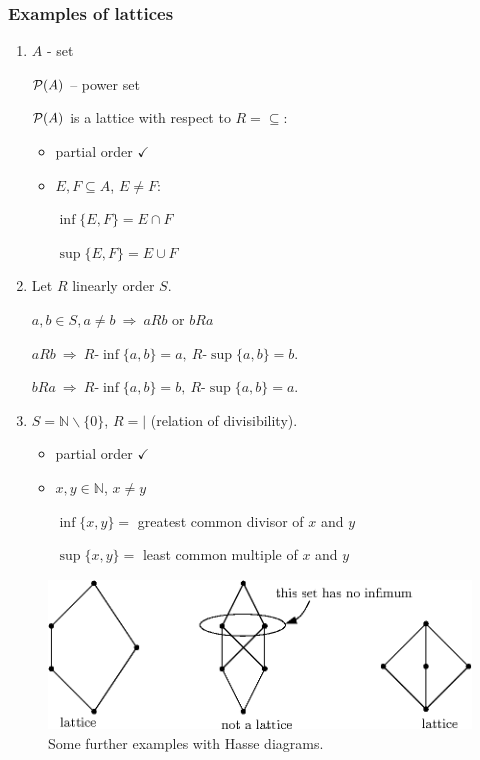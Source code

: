 \documentclass[11pt,paper=b5,footinclude,headinclude]{scrbook} %
\def\sledi {{~\Rightarrow~}}
\theoremstyle{remark}
\theoremstyle{definition} %
\theoremstyle{theorem} %
\begin{document}
\subsubsection{Examples of lattices}
\begin{enumerate}
  \item $A$ - set

  ${\cal P}(A)$ -- power set

  ${\cal P}(A)$ is a lattice with respect to  $R = \subseteq$:
  \begin{itemize}
    \item partial order $\checkmark$
     \item $E,F\subseteq A$, $E\neq F$:

     $\inf\{E,F\} = E\cap F$

     $\sup\{E,F\} = E\cup F$
  \end{itemize}
  \item Let $R$ linearly order $S$.

  $a, b\in S, a\neq b\sledi aRb$ or $bRa$

$aRb\sledi R\textrm{-}\inf\{a,b\} = a,~R\textrm{-}\sup\{a,b\} = b$.

$bRa\sledi R\textrm{-}\inf\{a,b\} = b,~R\textrm{-}\sup\{a,b\} = a$.

  \item $S = \mathbb{N}\backslash \{0\}$, $R = |$ (relation  of divisibility).
  \begin{itemize}
    \item partial order $\checkmark$
    \item $x,y\in \mathbb{N}$, $x\neq y$

    $\inf\{x,y\} = $ greatest common divisor of $x$ and $y$

    $\sup\{x,y\} = $ least common multiple of $x$ and $y$
  \end{itemize}
\end{enumerate}



\begin{figure}[hb]
	\centering
\includegraphics[height=40mm]{Hasse4-en.eps}
\caption{Some further examples with Hasse diagrams.}
\end{figure}
\end{document}
